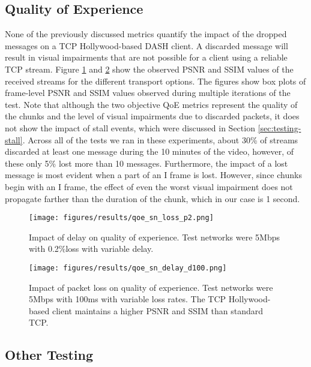 \subsection{Quality of Experience}
None of the previously discussed metrics quantify the impact of the dropped messages
on a TCP Hollywood-based DASH client. A discarded message will result in visual impairments
that are not possible for a client using a reliable TCP stream. Figure \ref{fig:qoe_delay2} 
and \ref{fig:qoe_loss} show the observed PSNR and SSIM values of the received streams for the 
different transport options. The figures show box plots of frame-level PSNR and SSIM values 
observed during multiple
iterations of the test. Note that although the two objective QoE metrics represent the
quality of the chunks and the level of visual impairments due to discarded packets, it
does not show the impact of stall events, which were discussed in
Section \ref{sec:testing-stall}. Across all of the tests we ran in these experiments,
about 30\% of streams discarded at least one message during the 10 minutes of the video,
however, of these only 5\% lost more than 10 messages. Furthermore, the impact of a lost
message is most evident when a part of an I frame is lost. However, since chunks begin with
an I frame, the effect of even the worst visual impairment does not propagate farther than
the duration of the chunk, which in our case is 1 second.

\begin{figure}
  \centering
  \texttt{[image: figures/results/qoe\_sn\_loss\_p2.png]}
  \caption{Impact of delay on quality of experience. Test networks were 5Mbps with 0.2\%loss 
           with variable delay.}
  \label{fig:qoe_delay2}
\end{figure}

\begin{figure}
  \centering
  \texttt{[image: figures/results/qoe\_sn\_delay\_d100.png]}
  \caption{Impact of packet loss on quality of experience. Test networks were 5Mbps with 100ms 
           with variable loss rates.  The TCP Hollywood-based client maintains a higher PSNR 
           and SSIM than standard TCP.}
  \label{fig:qoe_loss}
\end{figure}

\subsection{Other Testing}
\label{sec:other_testing}

